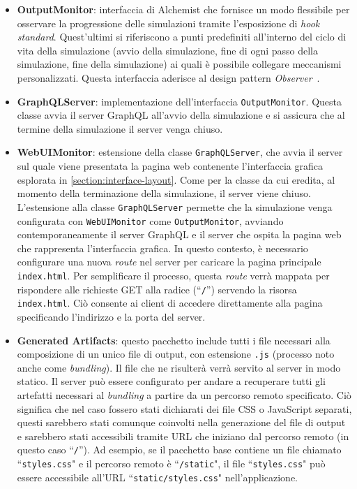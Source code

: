 \begin{itemize}
	\item \textbf{OutputMonitor}: interfaccia di Alchemist che fornisce un modo flessibile per osservare la progressione delle simulazioni tramite l'esposizione di \textit{hook standard}.  Quest'ultimi si riferiscono a punti predefiniti all'interno del ciclo di vita della simulazione (avvio della simulazione, fine di ogni passo della simulazione, fine della simulazione) ai quali è possibile collegare meccanismi personalizzati. Questa interfaccia aderisce al design pattern \textit{Observer}~\cite{Gamma1994}.
	\item \textbf{GraphQLServer}: implementazione dell'interfaccia  \texttt{OutputMonitor}. Questa classe avvia il server GraphQL all'avvio della simulazione e si assicura che al termine della simulazione il server venga chiuso.
    \item \textbf{WebUIMonitor}: estensione della classe \texttt{GraphQLServer}, che avvia il server sul quale viene presentata la pagina web contenente l'interfaccia grafica esplorata in \cref{section:interface-layout}. Come per la classe da cui eredita, al momento della terminazione della simulazione, il server viene chiuso. L'estensione alla classe \texttt{GraphQLServer} permette che la simulazione venga configurata con \texttt{WebUIMonitor} come \texttt{OutputMonitor}, avviando contemporaneamente il server GraphQL e il server che ospita la pagina web che rappresenta l'interfaccia grafica.
    In questo contesto, è necessario configurare una nuova \textit{route} nel server per caricare la pagina principale \texttt{index.html}. Per semplificare il processo, questa \textit{route} verrà mappata per rispondere alle richieste GET alla radice (``\texttt{/}'') servendo la risorsa \texttt{index.html}. Ciò consente ai client di accedere direttamente alla pagina specificando l'indirizzo e la porta del server.
	\item \textbf{Generated Artifacts}: questo pacchetto include tutti i file necessari alla composizione di un unico file di output, con estensione \texttt{.js} (processo noto anche come \textit{bundling}). Il file che ne risulterà verrà servito al server in modo statico. Il server può essere configurato per andare a recuperare tutti gli artefatti necessari al \textit{bundling} a partire da un percorso remoto specificato. Ciò significa che nel caso fossero stati dichiarati dei file CSS o JavaScript separati, questi sarebbero stati comunque coinvolti nella generazione del file di output e sarebbero stati accessibili tramite \ac{URL} che iniziano dal percorso remoto (in questo caso ``\texttt{/}'').	
	Ad esempio, se il pacchetto base contiene un file chiamato ``\texttt{styles.css}" e il percorso remoto è ``\texttt{/static}", il file ``\texttt{styles.css}" può essere accessibile all'URL ``\texttt{static/styles.css}" nell'applicazione. 
	
\end{itemize}

